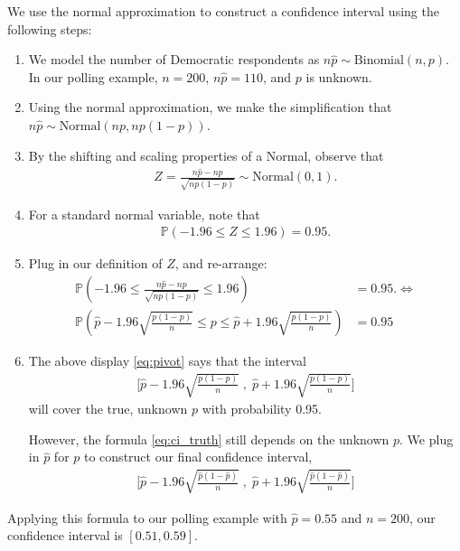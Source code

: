 \documentclass[11pt]{article}
\theoremstyle{definition}
\renewcommand{\P}{\mathbb{P}}
\begin{document}
We use the normal approximation to
construct a confidence interval using the following steps:
\begin{enumerate}
  \item We model the number of Democratic respondents as
  $n\hat p \sim \text{Binomial}(n, p)$.
  In our polling example, $n = 200$, $n\hat p = 110$, and $p$ is unknown.
  \item Using the normal approximation, we make the simplification that
  $n\hat p \sim \text{Normal}(np, np(1-p))$.
  \item By the shifting and scaling properties
  of a Normal,
  observe that
  \begin{align*}
    Z = \frac{n\hat p - np}{\sqrt{np(1-p)}} \sim \text{Normal}(0, 1).
  \end{align*}
  \item For a standard normal variable, note that
  \begin{align*}
    \P(-1.96 \leq Z \leq 1.96) = 0.95.
  \end{align*}
  \item Plug in our definition of $Z$, and re-arrange:
  \begin{align}
    \P\left(-1.96 \leq \frac{n\hat p - np}{\sqrt{np(1-p)}} \leq 1.96\right) &= 0.95.
    \iff \\
    \P\left(\hat p -1.96\sqrt{\frac{p(1-p)}{n}} \leq p \leq \hat p + 1.96\sqrt{\frac{p(1-p)}{n}}\right) &= 0.95
    \label{eq:pivot}
  \end{align}
  \item The above display \ref{eq:pivot} says that the interval
  \begin{align}
    \Big[\hat p - 1.96\sqrt{\frac{p(1-p)}{n}} \;,\;
    \hat p + 1.96\sqrt{\frac{p(1-p)}{n}}\Big]
    \label{eq:ci_truth}
  \end{align}
  will cover the true, unknown $p$ with probability 0.95.

  However, the formula \ref{eq:ci_truth} still depends on the unknown $p$.
  We plug in $\hat p$ for $p$ to construct our final confidence interval,
  \begin{align*}
    \Big[\hat p - 1.96\sqrt{\frac{\hat p(1-\hat p)}{n}} \;,\;
    \hat p + 1.96\sqrt{\frac{\hat p(1-\hat p)}{n}}\Big]
  \end{align*}
\end{enumerate}

Applying this formula to our polling example with $\hat p = 0.55$ and $n = 200$, our confidence interval is
$[0.51, 0.59]$.
\end{document}

